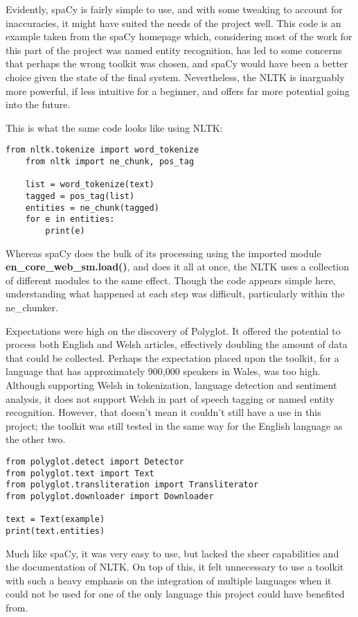 \documentclass[11pt,a4paper]{book}
\begin{document}
Evidently, spaCy is fairly simple to use, and with some tweaking to account for inaccuracies, it might have suited the needs of the project well. This code is an example taken from the spaCy homepage which, considering most of the work for this part of the project was named entity recognition, has led to some concerns that perhaps the wrong toolkit was chosen, and spaCy would have been a better choice given the state of the final system. Nevertheless, the NLTK is inarguably more powerful, if less intuitive for a beginner, and offers far more potential going into the future.

This is what the same code looks like using NLTK:
\begin{lstlisting}[caption={NLTK Test Code}]
	from nltk.tokenize import word_tokenize
	from nltk import ne_chunk, pos_tag
	
	list = word_tokenize(text)
	tagged = pos_tag(list)
	entities = ne_chunk(tagged)
	for e in entities:
		print(e)
\end{lstlisting}

Whereas spaCy does the bulk of its processing using the imported module \textbf{en\_core\_web\_sm.load()}, and does it all at once, the NLTK uses a collection of different modules to the same effect. Though the code appears simple here, understanding what happened at each step was difficult, particularly within the ne\_chunker.

Expectations were high on the discovery of Polyglot. It offered the potential to process both English and Welsh articles, effectively doubling the amount of data that could be collected. Perhaps the expectation placed upon the toolkit, for a language that has approximately 900,000 speakers in Wales, was too high\cite{noauthor_welsh_2019}.
 Although supporting Welsh in tokenization, language detection and sentiment analysis, it does not support Welsh in part of speech tagging or named entity recognition. However, that doesn't mean it couldn't still have a use in this project; the toolkit was still tested in the same way for the English language as the other two.
\begin{lstlisting}[caption={Polyglot}]
from polyglot.detect import Detector 
from polyglot.text import Text
from polyglot.transliteration import Transliterator
from polyglot.downloader import Downloader

text = Text(example)
print(text.entities)
\end{lstlisting}
Much like spaCy, it was very easy to use, but lacked the sheer capabilities and the documentation of NLTK. On top of this, it felt unnecessary to use a toolkit with such a heavy emphasis on the integration of multiple languages when it could not be used for one of the only language this project could have benefited from.
\end{document}
